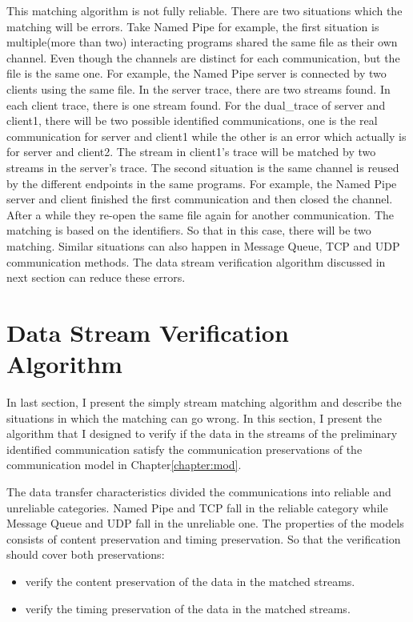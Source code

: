 This matching algorithm is not fully reliable. There are two situations which the matching will be errors. Take Named Pipe for example, the first situation is multiple(more than two) interacting programs shared the same file as their own channel. Even though the channels are distinct for each communication, but the file is the same one. For example, the Named Pipe server is connected by two clients using the same file. In the server trace, there are two streams found. In each client trace, there is one stream found. For the dual\_trace of server and client1, there will be two possible identified communications, one is the real communication for server and client1 while the other is an error which actually is for server and client2. The stream in client1's trace will be matched by two streams in the server's trace. The second situation is the same channel is reused by the different endpoints in the same programs. For example, the Named Pipe server and client finished the first communication and then closed the channel. After a while they re-open the same file again for another communication. The matching is based on the identifiers. So that in this case, there will be two matching. Similar situations can also happen in Message Queue, TCP and UDP communication methods. The data stream verification algorithm discussed in next section can reduce these errors. 

\section{Data Stream Verification Algorithm}\label{verfication}
In last section, I present the simply stream matching algorithm and describe the situations in which the matching can go wrong. In this section, I present the algorithm that I designed to verify if the data in the streams of the preliminary identified communication satisfy the communication preservations of the communication model in Chapter\ref{chapter:mod}. 

The data transfer characteristics divided the communications into reliable and unreliable categories. Named Pipe and TCP fall in the reliable category while Message Queue and UDP fall in the unreliable one. The properties of the models consists of content preservation and timing preservation. So that the verification should cover both preservations: 
\begin{itemize}
\item verify the content preservation of the data in the matched streams. 
\item verify the timing preservation of the data in the matched streams. 
\end{itemize}

